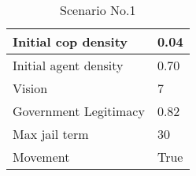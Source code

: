 \begin{table}[h]
        \begin{center}
          \begin{tabular}{|l|l|}
          \hline
            Initial cop density & 0.04 \\
          \hline\hline
            Initial agent density & 0.70 \\
          \hline
            Vision & 7 \\
          \hline
            Government Legitimacy & 0.82 \\
          \hline
            Max jail term & 30 \\
          \hline
            Movement & True \\
          \hline
          \end{tabular}
          \caption{Scenario No.1}\label{table1}
        \end{center}
      \end{table}